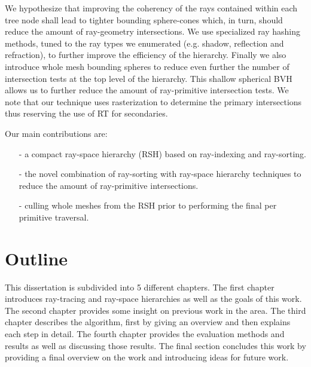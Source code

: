 We hypothesize that improving the coherency of the rays contained within each tree node shall lead to tighter bounding sphere-cones which, in turn, should reduce the amount of ray-geometry intersections. We use specialized ray hashing methods, tuned to the ray types we enumerated (e.g. shadow, reflection and refraction), to further improve the efficiency of the hierarchy. Finally we also introduce whole mesh bounding spheres to reduce even further the number of intersection tests at the top level of the hierarchy. This shallow spherical BVH allows us to further reduce the amount of ray-primitive intersection tests. We note that our technique uses rasterization to determine the primary intersections thus reserving the use of RT for secondaries.

\newpage

Our main contributions are:
\begin{itemize}
    \item[-] a compact ray-space hierarchy (RSH) based on ray-indexing and ray-sorting.
    \item[-] the novel combination of ray-sorting \cite{Garanzha10} with ray-space hierarchy techniques \cite{Roger07} to reduce the amount of ray-primitive intersections.
    \item[-] culling whole meshes from the RSH prior to performing the final per primitive traversal.
\end{itemize}

\section{Outline}
\label{section:outline}

This dissertation is subdivided into 5 different chapters. The first chapter introduces ray-tracing and ray-space hierarchies as well as the goals of this work. The second chapter provides some insight on previous work in the area. The third chapter describes the algorithm, first by giving an overview and then explains each step in detail. The fourth chapter provides the evaluation methods and results as well as discussing those results. The final section concludes this work by providing a final overview on the work and introducing ideas for future work.